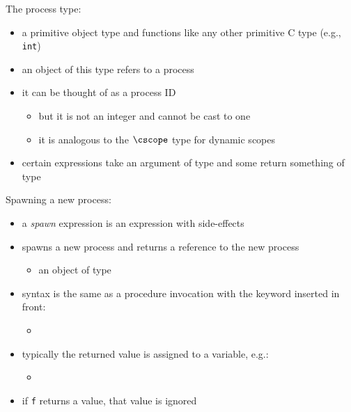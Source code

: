 \documentclass[t]{beamer}
\begin{document}
\begin{frame}{The process type: \cproc}
  \begin{itemize}
  \item a primitive object type and functions like any other primitive
    C type (e.g., \texttt{int})
  \item an object of this type refers to a
    process
  \item it can be thought of as a process ID
    \begin{itemize}
    \item but it is not an integer and cannot be cast to one
    \item it is analogous to the $\cscope$ type for dynamic scopes
    \end{itemize}
  \item certain expressions take an argument of \cproc{} type and some return
    something of \cproc{} type
  \end{itemize}
\end{frame}

\begin{frame}{Spawning a new process: \cspawn}
  \begin{itemize}
  \item a \emph{spawn} expression is an expression with side-effects
  \item spawns a new process and returns a reference to the new
    process
    \begin{itemize}
    \item an object of type \cproc
    \end{itemize}
  \item syntax is the same as a procedure invocation with the keyword
    \cspawn{} inserted in front:
    \begin{itemize}
    \item {}
    \end{itemize}
  \item typically the returned value is assigned to a variable, e.g.:
    \begin{itemize}
    \item {}
    \end{itemize}
  \item if \texttt{f} returns a value, that value is ignored
  \end{itemize}
\end{frame}
\end{document}
